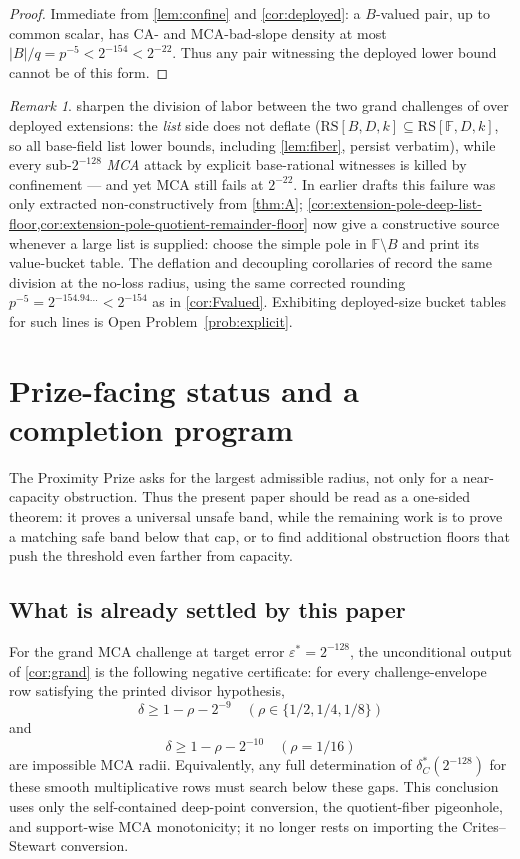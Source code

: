 \documentclass[11pt]{article}
\theoremstyle{definition}
\theoremstyle{remark}
\newtheorem{remark}[theorem]{Remark}
\newcommand{\F}{\mathbb{F}}
\newcommand{\B}{B}
\newcommand{\RS}{\mathrm{RS}}
\begin{document}
\begin{proof}
Immediate from \cref{lem:confine} and \cref{cor:deployed}: a $\B$-valued pair, up to common scalar, has CA- and MCA-bad-slope density at most $|\B|/q=p^{-5}<2^{-154}<2^{-22}$. Thus any pair witnessing the deployed lower bound cannot be of this form.
\end{proof}

\begin{remark}
 sharpen the division of labor between the two grand challenges of \cite{ABF26} over deployed extensions: the \emph{list} side does not deflate ($\RS[\B,D,k]\subseteq\RS[\F,D,k]$, so all base-field list lower bounds, including \cref{lem:fiber}, persist verbatim), while every sub-$2^{-128}$ \emph{MCA} attack by explicit base-rational witnesses is killed by confinement --- and yet MCA still fails at $2^{-22}$.  In earlier drafts this failure was only extracted non-constructively from \cref{thm:A}; \cref{cor:extension-pole-deep-list-floor,cor:extension-pole-quotient-remainder-floor} now give a constructive source whenever a large list is supplied: choose the simple pole in $\F\setminus\B$ and print its value-bucket table. The deflation and decoupling corollaries of \cite{Cho26b} record the same division at the no-loss radius, using the same corrected rounding $p^{-5}=2^{-154.94\ldots}<2^{-154}$ as in \cref{cor:Fvalued}. Exhibiting deployed-size bucket tables for such lines is Open Problem~\ref{prob:explicit}.
\end{remark}


\section{Prize-facing status and a completion program}\label{sec:prize-program}

The Proximity Prize asks for the largest admissible radius, not only for a
near-capacity obstruction.  Thus the present paper should be read as a
one-sided theorem: it proves a universal unsafe band, while the remaining work
is to prove a matching safe band below that cap, or to find additional
obstruction floors that push the threshold even farther from capacity.

\subsection{What is already settled by this paper}

For the grand MCA challenge at target error $\varepsilon^*=2^{-128}$, the
unconditional output of \cref{cor:grand} is the following negative certificate:
for every challenge-envelope row satisfying the printed divisor hypothesis,
\[
        \delta\ge 1-\rho-2^{-9}
        \quad(\rho\in\{1/2,1/4,1/8\})
\]
and
\[
        \delta\ge 1-\rho-2^{-10}
        \quad(\rho=1/16)
\]
are impossible MCA radii.  Equivalently, any full determination of
$\delta_C^*(2^{-128})$ for these smooth multiplicative rows must search below
these gaps.  This conclusion uses only the self-contained deep-point conversion,
the quotient-fiber pigeonhole, and support-wise MCA monotonicity; it no longer
rests on importing the Crites--Stewart conversion.
\end{document}
